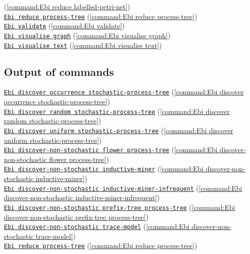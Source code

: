 {(\cref{command:Ebi reduce labelled-petri-net})\\\null\qquad\hyperref[command:Ebi reduce process-tree]{\texttt{Ebi reduce process-tree}} (\cref{command:Ebi reduce process-tree})\\\null\qquad\hyperref[command:Ebi validate]{\texttt{Ebi validate}} (\cref{command:Ebi validate})\\\null\qquad\hyperref[command:Ebi visualise graph]{\texttt{Ebi visualise graph}} (\cref{command:Ebi visualise graph})\\\null\qquad\hyperref[command:Ebi visualise text]{\texttt{Ebi visualise text}} (\cref{command:Ebi visualise text})
\subsection*{Output of commands} \null\qquad\hyperref[command:Ebi discover occurrence stochastic-process-tree]{\texttt{Ebi discover occurrence stochastic-process-tree}} (\cref{command:Ebi discover occurrence stochastic-process-tree})\\\null\qquad\hyperref[command:Ebi discover random stochastic-process-tree]{\texttt{Ebi discover random stochastic-process-tree}} (\cref{command:Ebi discover random stochastic-process-tree})\\\null\qquad\hyperref[command:Ebi discover uniform stochastic-process-tree]{\texttt{Ebi discover uniform stochastic-process-tree}} (\cref{command:Ebi discover uniform stochastic-process-tree})\\\null\qquad\hyperref[command:Ebi discover-non-stochastic flower process-tree]{\texttt{Ebi discover-non-stochastic flower process-tree}} (\cref{command:Ebi discover-non-stochastic flower process-tree})\\\null\qquad\hyperref[command:Ebi discover-non-stochastic inductive-miner]{\texttt{Ebi discover-non-stochastic inductive-miner}} (\cref{command:Ebi discover-non-stochastic inductive-miner})\\\null\qquad\hyperref[command:Ebi discover-non-stochastic inductive-miner-infrequent]{\texttt{Ebi discover-non-stochastic inductive-miner-infrequent}} (\cref{command:Ebi discover-non-stochastic inductive-miner-infrequent})\\\null\qquad\hyperref[command:Ebi discover-non-stochastic prefix-tree process-tree]{\texttt{Ebi discover-non-stochastic prefix-tree process-tree}} (\cref{command:Ebi discover-non-stochastic prefix-tree process-tree})\\\null\qquad\hyperref[command:Ebi discover-non-stochastic trace-model]{\texttt{Ebi discover-non-stochastic trace-model}} (\cref{command:Ebi discover-non-stochastic trace-model})\\\null\qquad\hyperref[command:Ebi reduce process-tree]{\texttt{Ebi reduce process-tree}} (\cref{command:Ebi reduce process-tree})
}
